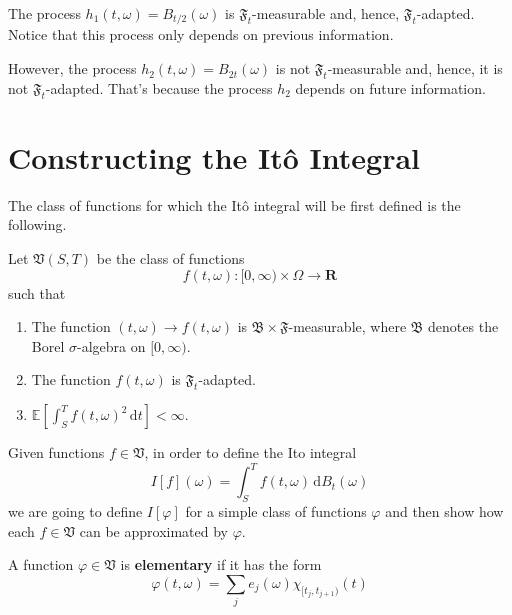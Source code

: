 \begin{example}
	The process $h_1(t, \omega) = B_{t/2}(\omega)$ is $\mathfrak{F}_t$-measurable and, hence, $\mathfrak{F}_t$-adapted. Notice that this process only depends on previous information.
	
	However, the process $h_2(t, \omega) = B_{2t}(\omega)$ is not $\mathfrak{F}_t$-measurable and, hence, it is not $\mathfrak{F}_t$-adapted. That's because the process $h_2$ depends on future information.
\end{example}

%
%

\section{Constructing the Itô Integral}

The class of functions for which the Itô integral will be first defined is the following.

\begin{definition}\label{def:ito-class}
	Let $\mathfrak{V}(S,T)$ be the class of functions
	\[
		f(t, \omega) : [0, \infty) \times \Omega \longrightarrow \textbf{R}
	\]
	such that
	\begin{enumerate}
		\item The function $(t, \omega) \longrightarrow f(t, \omega)$ is $\mathfrak{B} \times \mathfrak{F}$-measurable, where $\mathfrak{B}$ denotes the Borel $\sigma$-algebra on $[0, \infty)$.
		\item The function $f(t,\omega)$ is $\mathfrak{F}_t$-adapted.
		\item $\mathbb{E} \left[ \int_S^T f(t, \omega)^2 \, \mathrm{d}t \right] < \infty$.
	\end{enumerate}
\end{definition}

Given functions $f \in \mathfrak{V}$, in order to define the Ito integral
\[
	I[f](\omega) = \int_S^T f(t, \omega)\, \mathrm{d}B_t(\omega)
\]
we are going to define $I[\varphi]$ for a simple class of functions $\varphi$ and then show how each $f \in \mathfrak{V}$ can be approximated by $\varphi$.

\begin{definition}
	A function $\varphi \in \mathfrak{V}$ is \textbf{elementary} if it has the form
\[
	\varphi(t, \omega) = \sum_j e_j(\omega) \chi_{[t_j, t_{j+1})}(t)
\]
\end{definition}

